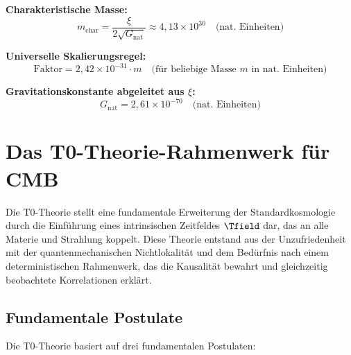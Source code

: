	\textbf{Charakteristische Masse:}
	\begin{equation}
		m_{\text{char}} = \frac{\xi}{2\sqrt{G_{\text{nat}}}} \approx 4,13 \times 10^{30} \quad \text{(nat. Einheiten)}
	\end{equation}
	
	\textbf{Universelle Skalierungsregel:}
	\begin{equation}
		\text{Faktor} = 2,42 \times 10^{-31} \cdot m \quad \text{(für beliebige Masse } m \text{ in nat. Einheiten)}
	\end{equation}
	
	\textbf{Gravitationskonstante abgeleitet aus $\xi$:}
	\begin{equation}
		G_{\text{nat}} = 2,61 \times 10^{-70} \quad \text{(nat. Einheiten)}
	\end{equation}
	
	
	\section{Das T0-Theorie-Rahmenwerk für CMB}
	\label{sec:t0_framework}
	
	Die T0-Theorie stellt eine fundamentale Erweiterung der Standardkosmologie durch die Einführung eines intrinsischen Zeitfeldes $\Tfield$ dar, das an alle Materie und Strahlung koppelt. Diese Theorie entstand aus der Unzufriedenheit mit der quantenmechanischen Nichtlokalität und dem Bedürfnis nach einem deterministischen Rahmenwerk, das die Kausalität bewahrt und gleichzeitig beobachtete Korrelationen erklärt.
	
	\subsection{Fundamentale Postulate}
	
	Die T0-Theorie basiert auf drei fundamentalen Postulaten:
	

